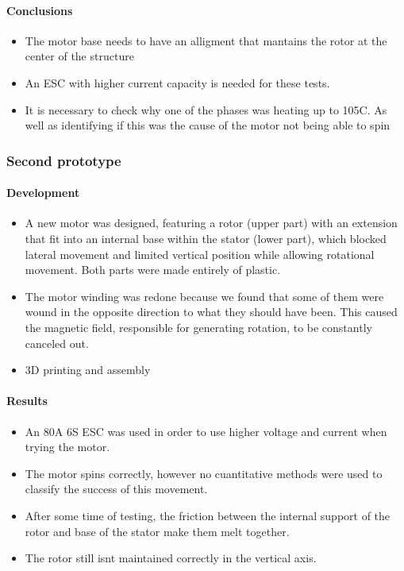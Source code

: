 \documentclass{article}
\begin{document}
\paragraph{Conclusions}
\begin{itemize}
    \item The motor base needs to have an alligment that mantains the rotor at the center of the structure
    \item An ESC with higher current capacity is needed for these tests.
    \item It is necessary to check why one of the phases was heating up to 105\degree C. As well as identifying if this was the cause of the motor not being able to spin
\end{itemize}


\subsubsection{Second prototype}
\paragraph[short]{Development}
\begin{itemize}
    \item A new motor was designed, featuring a rotor (upper part) with an extension that fit into an internal base within the stator (lower part), 
    which blocked lateral movement and limited vertical position while allowing rotational movement. Both parts were made entirely of plastic.
    \item The motor winding was redone because we found that some of them were wound in the opposite direction to what they should have been. 
    This caused the magnetic field, responsible for generating rotation, to be constantly canceled out.
    \item 3D printing and assembly
\end{itemize}

\paragraph{Results}
\begin{itemize}
    \item An 80A 6S ESC was used in order to use higher voltage and current when trying the motor. 
    \item The motor spins correctly, however no cuantitative methods were used to classify the success of this movement.
    \item After some time of testing, the friction between the internal support of the rotor and base of the stator make them melt together.
    \item The rotor still isnt maintained correctly in the vertical axis.
\end{itemize}
\end{document}
